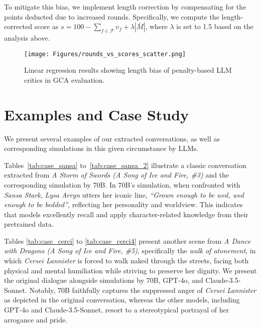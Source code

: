 To mitigate this bias, we implement length correction by compensating  
for the points deducted due to increased rounds. 
Specifically, we compute the length-corrected score as \( s = 100-\sum_{f\in\mathcal{F}}v_f + \lambda|\bar{M}| \), where \( \lambda \) is set to 1.5 based on the analysis above.


\begin{figure*}[!t]
    \centering
    \texttt{[image: Figures/rounds\_vs\_scores\_scatter.png]}
    \caption{
    Linear regression results showing length bias of penalty-based LLM critics in GCA evaluation.
    }
    \label{fig:length_correction}
\end{figure*}

 \section{Examples and Case Study}

We present several examples of our extracted conversations, as well as corresponding  simulations in this given circumstance by LLMs.

Tables~\ref{tab:case_sansa} to~\ref{tab:case_sansa_2} illustrate a classic  conversation extracted from \textit{A Storm of Swords (A Song of Ice and Fire, \#3)} and the corresponding simulation by \method 70B. In \method 70B’s simulation, when confronted with \textit{Sansa Stark}, \textit{Lysa Arryn} utters her iconic line, \textit{“Grown enough to be wed, wed enough to be bedded”}, reflecting her personality and worldview. 
This indicates that \method models excellently recall and apply character-related knowledge from their pretrained data.

Tables \ref{tab:case_cerci} to \ref{tab:case_cerci4} present another scene from \textit{A Dance with Dragons (A Song of Ice and Fire, \#5)}, specifically the \textit{walk of atonement}, in which \textit{Cersei Lannister} is forced to walk naked through the streets, facing both physical and mental humiliation while striving to preserve her dignity. 
We present the original dialogue alongside simulations by \method 70B, GPT-4o, and Claude-3.5-Sonnet. 
Notably, \method 70B faithfully captures the suppressed anger of \textit{Cersei Lannister} as depicted in the original conversation, whereas the other models, including GPT-4o and Claude-3.5-Sonnet, resort to a stereotypical portrayal of her arrogance and pride.






